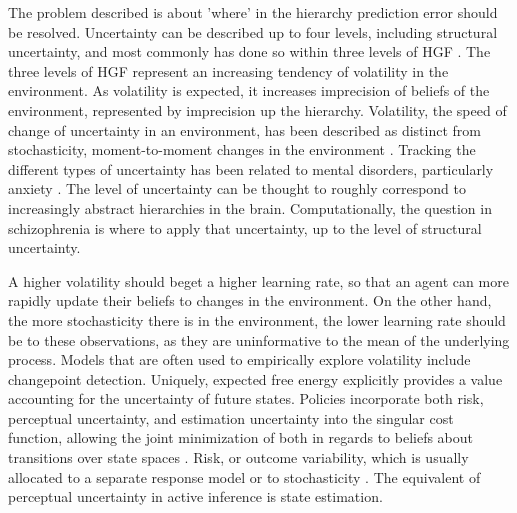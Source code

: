 \documentclass{article}
\begin{document}
The problem described is about 'where' in the hierarchy prediction error should be resolved. Uncertainty can be described up to four levels, including structural uncertainty, and most commonly has done so within three levels of HGF \citep{sandhu2023transdiagnostic}. The three levels of HGF represent an increasing tendency of volatility in the environment. As volatility is expected, it increases imprecision of beliefs of the environment, represented by imprecision up the hierarchy. Volatility, the speed of change of uncertainty in an environment, has been described as distinct from stochasticity, moment-to-moment changes in the environment \citep{piray2021Model}. Tracking the different types of uncertainty has been related to mental disorders, particularly anxiety \citep{pulcu2019MisestimationUncertaintyAffective, hedley2023UnderstandingAnxietyUncertainty}. The level of uncertainty can be thought to roughly correspond to increasingly abstract hierarchies in the brain. Computationally, the question in schizophrenia is where to apply that uncertainty, up to the level of structural uncertainty.

A higher volatility should beget a higher learning rate, so that an agent can more rapidly update their beliefs to changes in the environment. On the other hand, the more stochasticity there is in the environment, the lower learning rate should be to these observations, as they are uninformative to the mean of the underlying process. Models that are often used to empirically explore volatility include changepoint detection. Uniquely, expected free energy explicitly provides a value accounting for the uncertainty of future states. Policies incorporate both risk, perceptual uncertainty, and estimation uncertainty into the singular cost function, allowing the joint minimization of both in regards to beliefs about transitions over state spaces \citep{bruckner2024DecisionMakingUncertainty, bruckner2022UnderstandingLearningUncertainty}. Risk, or outcome variability, which is usually allocated to a separate response model or to stochasticity \citep{mathys2011BayesianFoundationIndividual}. The equivalent of perceptual uncertainty in active inference is state estimation.
\end{document}
